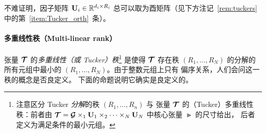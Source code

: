 不难证明，因子矩阵
$\mathbf{U}_i \in \mathbb{R}^{d_i \times R_i}$ 总可以取为酉矩阵（见下方注记~\ref{rem:tuckers}
中的第~\ref{item:Tucker_orth}~条）。


\paragraph{多重线性秩（Multi-linear rank）} 张量 $\bm{\mathcal{T}}$ 的\emph{多重线性（或 Tucker）秩}\footnote{注意区分 Tucker \emph{分解}的秩 $(R_1,\dots,R_n)$ 与
张量 $\bm{\mathcal{T}}$ 的（Tucker）多重线性秩：前者由
$\bm{\mathcal{T}} = \bm{\mathcal{G}} \times_1 \mathbf{U}_1 \times_2 \dots \times_N \mathbf{U}_N$ 中核心张量 $\Gt$ 的尺寸给出，
后者定义为满足条件的最小元组。} 是使得
$\bm{\mathcal{T}}$ 存在秩 $(R_1,\dots,R_N)$ 的分解的所有元组中最小的
$(R_1,\dots,R_N)$。由于整数元组上只有
偏序关系，人们会问这一秩的概念是否良定义。
下面的命题说明它确实是良定义的。

